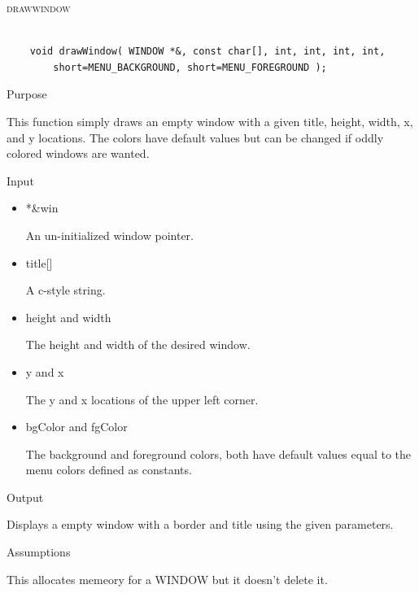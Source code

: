 \documentclass[pdftex, 11pt]{article}
\begin{document}
\begin{description}
\begin{description}
		\end{description}


	\item{\textsc{drawwindow}}

		\begin{lstlisting}

	void drawWindow( WINDOW *&, const char[], int, int, int, int, 
	    short=MENU_BACKGROUND, short=MENU_FOREGROUND );
		\end{lstlisting}

		\begin{description}
			\item{Purpose}

				This function simply draws an empty window with a given title, height, width,
				x, and y locations.  The colors have default values but can be changed if
				oddly colored windows are wanted.

			\item{Input}

				\begin{itemize}

					\item{*\&win}

						An un-initialized window pointer.

					\item{title[]}

						A c-style string.

					\item{height and width}

						The height and width of the desired window.

					\item{y and x}

						The y and x locations of the upper left corner.

					\item{bgColor and fgColor}

						The background and foreground colors, both have default values equal
						to the menu colors defined as constants.

				\end{itemize}

			\item{Output}

				Displays a empty window with a border and title using the
				given parameters.

			\item{Assumptions}

				This allocates memeory for a WINDOW but it doesn't delete it.


\end{description}
\end{description}
\end{document}
